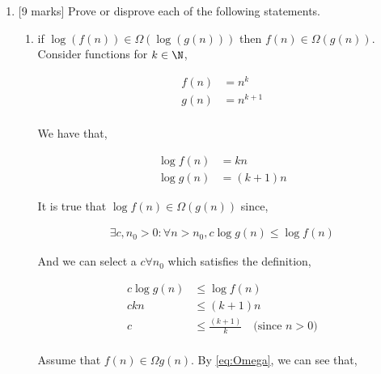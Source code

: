 \begin{enumerate}
    \item {[9 marks]} Prove or disprove each of the following statements.
          \begin{enumerate}
              \item if $\log (f(n)) \in \Omega(\log(g(n)))$ then $f(n) \in \Omega(g(n))$. \\

                    Consider functions for $k \in \N$,

                    \begin{align*}
                        f(n) & = n^{k}   \\
                        g(n) & = n^{k+1} \\
                    \end{align*}

                    We have that,

                    \begin{align*}
                        \log{f(n)} & = kn                   \\
                        \log{g(n)} & = \left(k+ 1 \right) n
                    \end{align*}

                    It is true that $\log{f(n)} \in \Omega\left(g \left( n \right) \right)$ since,

                    \begin{align}
                        \exists c, n_0 > 0: \forall n > n_0, c \log{g \left( n \right)} \le \log{f \left( n \right)} \label{eq:Omega}
                    \end{align}

                    And we can select a $c \forall n_0$ which satisfies the definition,

                    \begin{align*}
                        c \log{g \left( n \right)} & \le \log{f \left(n \right)}                                    \\
                        c kn                       & \le \left(k + 1 \right) n                                      \\
                        c                          & \le \frac{\left(k + 1 \right)}{k} \quad \text{(since $n > 0$)} \\
                    \end{align*}

                    Assume that $f \left( n \right) \in \Omega g \left( n \right)$. By \ref{eq:Omega}, we can see that,


\end{enumerate}
\end{enumerate}
